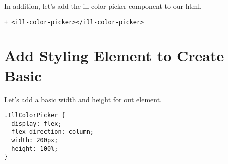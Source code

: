 In addition, let's add the ill-color-picker component to our html.
\begin{lstlisting}
+ <ill-color-picker></ill-color-picker>
\end{lstlisting}

\section{ Add Styling Element to Create Basic  }
Let's add a basic width and height for out element.
\begin{lstlisting}
.IllColorPicker {
  display: flex;
  flex-direction: column;
  width: 200px;
  height: 100%;
}
\end{lstlisting}
